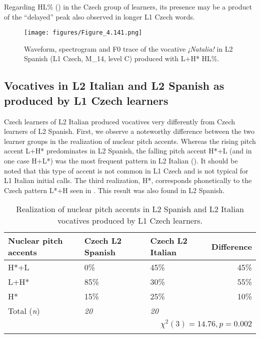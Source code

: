 Regarding HL\% () in the Czech group of learners, its presence may be a product of the “delayed” peak also observed in longer L1 Czech words.

\begin{figure}


\texttt{[image: figures/Figure\_4.141.png]}



\caption{Waveform, spectrogram and F0 trace of the vocative \textit{¡Natalia!} in L2 Spanish (L1 Czech, M\_14, level C) produced with L+H* HL\%.}
\label{fig:4.141}
\end{figure}

\subsection{Vocatives in L2 Italian and L2 Spanish as produced by L1 Czech learners}\label{sec:4.5.3}

Czech learners of L2 Italian produced vocatives very differently from Czech learners of L2 Spanish. First, we observe a noteworthy difference between the two learner groups in the realization of nuclear pitch accents. Whereas the rising pitch accent L+H* predominates in L2 Spanish, the falling pitch accent H*+L (and in one case H+L*) was the most frequent pattern in L2 Italian (). It should be noted that this type of accent is not common in L1 Czech and is not typical for L1 Italian initial calls. The third realization, H*, corresponds phonetically to the Czech pattern L*+H seen in . This result was also found in L2 Spanish.

\begin{table}
\begin{tabularx}{\textwidth}{lYYr}

\lsptoprule

{Nuclear pitch accents} & {Czech L2 Spanish} & {Czech L2 Italian} & {Difference}\\
\midrule
H*+L &  0\% & 45\% &  45\%\\
L+H* &  85\% &  30\% &  55\%\\
H* &  15\% &  25\% &  10\%\\
\midrule
Total (\textit{n}) & {\itshape 20} & {\itshape 20} &  \\
\\
\lspbottomrule
\end{tabularx}

\caption{Realization of nuclear pitch accents in L2 Spanish and L2 Italian vocatives produced by L1 Czech learners.}
\label{tab:4.37}
\end{table}

